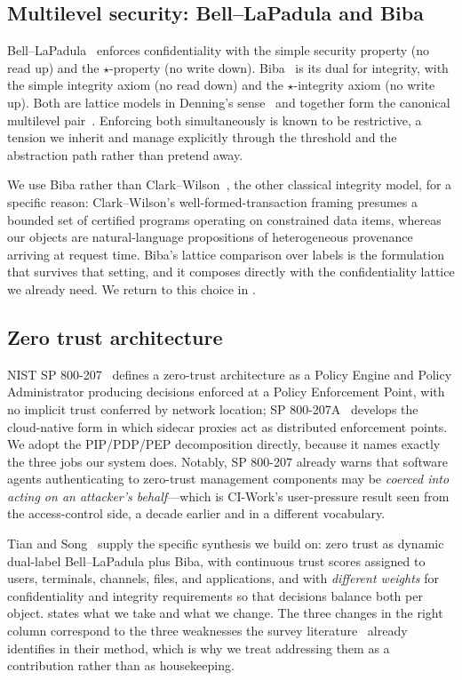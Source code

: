 \documentclass[conference,compsoc]{IEEEtran}
\begin{document}
\subsection{Multilevel security: Bell--LaPadula and Biba}

Bell--LaPadula~\cite{belllapadula1976} enforces confidentiality with the
simple security property (no read up) and the $\star$-property (no write
down). Biba~\cite{biba1977} is its dual for integrity, with the simple
integrity axiom (no read down) and the $\star$-integrity axiom (no write up).
Both are lattice models in Denning's sense~\cite{denning1976} and together form
the canonical multilevel pair~\cite{nistir7316}. Enforcing both simultaneously
is known to be restrictive, a tension we inherit and manage explicitly through
the threshold and the abstraction path rather than pretend away.

We use Biba rather than Clark--Wilson~\cite{clarkwilson1987}, the other
classical integrity model, for a specific reason: Clark--Wilson's
well-formed-transaction framing presumes a bounded set of certified programs
operating on constrained data items, whereas our objects are natural-language
propositions of heterogeneous provenance arriving at request time. Biba's
lattice comparison over labels is the formulation that survives that setting,
and it composes directly with the confidentiality lattice we already need. We
return to this choice in .

\subsection{Zero trust architecture}

NIST SP 800-207~\cite{nist800207} defines a zero-trust architecture as a Policy
Engine and Policy Administrator producing decisions enforced at a Policy
Enforcement Point, with no implicit trust conferred by network location;
SP 800-207A~\cite{nist800207a} develops the cloud-native form in which sidecar
proxies act as distributed enforcement points. We adopt the PIP/PDP/PEP
decomposition directly, because it names exactly the three jobs our system
does. Notably, SP 800-207 already warns that software agents authenticating to
zero-trust management components may be \emph{coerced into acting on an
attacker's behalf}---which is CI-Work's user-pressure result seen from the
access-control side, a decade earlier and in a different vocabulary.

Tian and Song~\cite{tiansong2021} supply the specific synthesis we build on:
zero trust as dynamic dual-label Bell--LaPadula plus Biba, with continuous
trust scores assigned to users, terminals, channels, files, and applications,
and with \emph{different weights} for confidentiality and integrity
requirements so that decisions balance both per object. 
states what we take and what we change. The three changes in the right column
correspond to the three weaknesses the survey
literature~\cite{he2022zerotrust,sultana2024zerotrust} already identifies in
their method, which is why we treat addressing them as a contribution rather
than as housekeeping.
\end{document}
